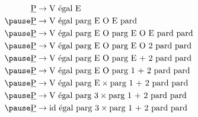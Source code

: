 \[
    \begin{aligned}
        \underline{\text{P}} & \to \text{V \'egal E} \\
        \pause
        \underline{\text{P}} & \to \text{V \'egal parg E O E pard} \\
        \pause
        \underline{\text{P}} & \to \text{V \'egal parg E O parg E O E pard pard} \\
        \pause
        \underline{\text{P}} & \to \text{V \'egal parg E O parg E O 2 pard pard} \\
        \pause
        \underline{\text{P}} & \to \text{V \'egal parg E O parg E + 2 pard pard} \\
        \pause
        \underline{\text{P}} & \to \text{V \'egal parg E O parg 1 + 2 pard pard} \\
        \pause
        \underline{\text{P}} & \to \text{V \'egal parg E} \times \text{parg 1 + 2 pard pard} \\
        \pause
        \underline{\text{P}} & \to \text{V \'egal parg 3} \times \text{parg 1 + 2 pard pard} \\
        \pause
        \underline{\text{P}} & \to \text{id \'egal parg 3} \times \text{parg 1 + 2 pard pard}
    \end{aligned}
\]
